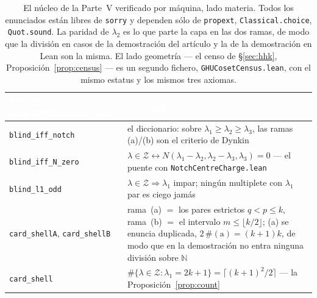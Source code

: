 \documentclass[11pt,a4paper]{article}
\begin{document}
\begin{table}[t]
\centering\small
\begin{tabular}{p{5.6cm}p{8.5cm}}
\toprule
\rowcolor{hdrblue}
\textcolor{white}{Teorema en Lean}\newline\textcolor{white}{(\texttt{GHUBlindCount.lean})} &
\textcolor{white}{contenido}\\
\midrule
\texttt{blind\_iff\_notch} &
el diccionario: sobre $\lambda_1\ge\lambda_2\ge\lambda_3$, las ramas (a)/(b) son el criterio de
Dynkin\\
\midrule
\rowcolor{softgrey}
\texttt{blind\_iff\_N\_zero} &
$\lambda\in\mathcal Z\leftrightarrow N(\lambda_1{-}\lambda_2,\lambda_2{-}\lambda_3,\lambda_3)=0$
--- el puente con \texttt{NotchCentreCharge.lean}\\
\midrule
\texttt{blind\_l1\_odd} &
$\lambda\in\mathcal Z\Rightarrow\lambda_1$ impar; ningún multiplete con $\lambda_1$ par es ciego
jamás\\
\midrule
\rowcolor{softgrey}
\texttt{card\_shellA}, \texttt{card\_shellB} &
rama~(a) $=$ los pares estrictos $q<p\le k$, rama~(b) $=$ el intervalo $m\le\lfloor k/2\rfloor$;
(a) se enuncia duplicada, $2\,\#(\mathrm a)=(k{+}1)k$, de modo que en la demostración no entra
ninguna división sobre $\mathbb N$\\
\midrule
\texttt{card\_shell} &
$\#\{\lambda\in\mathcal Z:\lambda_1=2k{+}1\}=\lceil(k+1)^2/2\rceil$ --- la
Proposición~\ref{prop:count}\\
\bottomrule
\end{tabular}
\caption{El núcleo de la Parte~V verificado por máquina, lado materia. Todos los enunciados están
libres de \texttt{sorry} y dependen sólo de \texttt{propext}, \texttt{Classical.choice},
\texttt{Quot.sound}. La paridad de $\lambda_2$ es lo que parte la capa en las dos ramas, de modo que
la división en casos de la demostración del artículo y la de la demostración en Lean son la misma.
El lado geometría --- el censo de \S\ref{sec:hhk}, Proposición~\ref{prop:census} --- es un segundo
fichero, \texttt{GHUCosetCensus.lean}, con el mismo estatus y los mismos tres axiomas.}
\label{tab:leanV}
\end{table}
\end{document}
